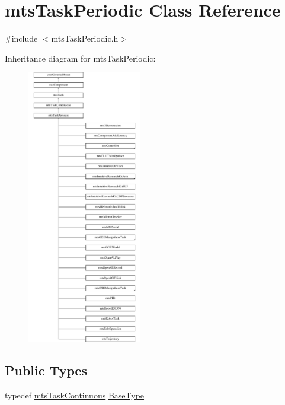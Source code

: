 \hypertarget{classmts_task_periodic}{\section{mts\-Task\-Periodic Class Reference}
\label{classmts_task_periodic}
}


{\ttfamily \#include $<$mts\-Task\-Periodic.\-h$>$}

Inheritance diagram for mts\-Task\-Periodic\-:\begin{figure}[H]
\begin{center}
\leavevmode
\includegraphics[height=12.000000cm]{d5/df4/classmts_task_periodic}
\end{center}
\end{figure}
\subsection*{Public Types}
\begin{DoxyCompactItemize}
\item 
typedef \hyperlink{classmts_task_continuous}{mts\-Task\-Continuous} \hyperlink{classmts_task_periodic_ae0e61abd9d99d5c58d97bfd2401ebd6e}{Base\-Type}
\end{DoxyCompactItemize}
